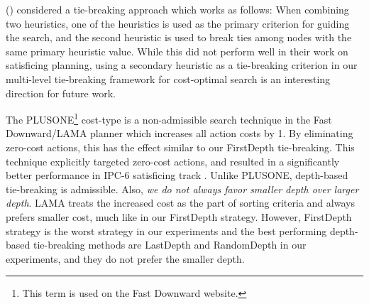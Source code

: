 \citeauthor{RogerH10} (\citeyear{RogerH10}) considered a tie-breaking approach which works as follows:
When combining two heuristics, one of the
heuristics is used as the primary criterion for guiding the search,
and the second heuristic is used to break ties among nodes with the same primary
heuristic value.
While this did not perform well in their work on satisficing planning, 
using a secondary heuristic as a tie-breaking criterion in our multi-level tie-breaking framework 
for cost-optimal search is an interesting direction for future work.

The PLUSONE\footnote{This term is used on the Fast Downward website.}
cost-type is a non-admissible search technique in the Fast Downward/LAMA planner
\cite{richter2010lama} which increases all action costs by 1.
By eliminating zero-cost actions, this has the effect similar to our
FirstDepth tie-breaking.
This technique explicitly targeted zero-cost actions,
and resulted in a significantly better performance in IPC-6
satisficing track \cite[p.137, Sec. 3.3.2]{richter2010lama}.
Unlike PLUSONE, depth-based tie-breaking is admissible.
Also, \emph{we
do not always favor smaller depth over larger depth}. LAMA treats the
increased cost as the part of sorting criteria and always prefers
smaller cost, much like in our FirstDepth strategy.  However, FirstDepth
strategy is the worst strategy in our experiments and the best
performing depth-based tie-breaking methods are LastDepth and RandomDepth
in our experiments, and they do not prefer the smaller depth.

